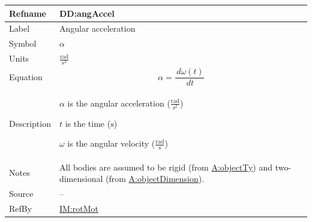 \documentclass[12pt]{article}
\begin{document}
\medskip
\noindent
\begin{minipage}{\textwidth}
\begin{tabular}{>{\raggedright}p{}>{\raggedright\arraybackslash}p{}}
\toprule \textbf{Refname} & \textbf{DD:angAccel}
\label{DD:angAccel}
\\ \midrule
Label & Angular acceleration
        
\\ \midrule
Symbol & $α$
         
\\ \midrule
Units & $\frac{\text{rad}}{\text{s}^{2}}$
        
\\ \midrule
Equation & \begin{displaymath}
           α=\frac{\,dω\left(t\right)}{\,dt}
           \end{displaymath}
\\ \midrule
Description & \begin{symbDescription}
              \item{$α$ is the angular acceleration ($\frac{\text{rad}}{\text{s}^{2}}$)}
              \item{$t$ is the time (${\text{s}}$)}
              \item{$ω$ is the angular velocity ($\frac{\text{rad}}{\text{s}}$)}
              \end{symbDescription}
\\ \midrule
Notes & All bodies are assumed to be rigid (from \hyperref[assumpOT]{A:objectTy}) and two-dimensional (from \hyperref[assumpOD]{A:objectDimension}).
        
\\ \midrule
Source & --
         
\\ \midrule
RefBy & \hyperref[IM:rotMot]{IM:rotMot}
        
\\ \bottomrule
\end{tabular}
\end{minipage}
\end{document}
